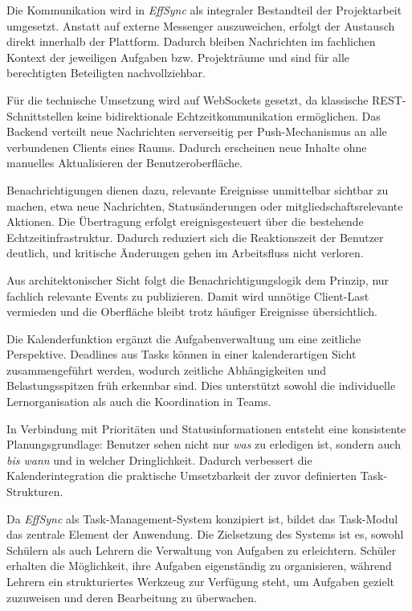 \label{sec:kommunikation}
Die Kommunikation wird in \textit{EffSync} als integraler Bestandteil der Projektarbeit umgesetzt. Anstatt auf externe Messenger auszuweichen, erfolgt der Austausch direkt innerhalb der Plattform. Dadurch bleiben Nachrichten im fachlichen Kontext der jeweiligen Aufgaben bzw. Projekträume und sind für alle berechtigten Beteiligten nachvollziehbar.

Für die technische Umsetzung wird auf WebSockets gesetzt, da klassische REST-Schnittstellen keine bidirektionale Echtzeitkommunikation ermöglichen. Das Backend verteilt neue Nachrichten serverseitig per Push-Mechanismus an alle verbundenen Clients eines Raums. Dadurch erscheinen neue Inhalte ohne manuelles Aktualisieren der Benutzeroberfläche.

\label{sec:benachrichtigungen}
Benachrichtigungen dienen dazu, relevante Ereignisse unmittelbar sichtbar zu machen, etwa neue Nachrichten, Statusänderungen oder mitgliedschaftsrelevante Aktionen. Die Übertragung erfolgt ereignisgesteuert über die bestehende Echtzeitinfrastruktur. Dadurch reduziert sich die Reaktionszeit der Benutzer deutlich, und kritische Änderungen gehen im Arbeitsfluss nicht verloren.

Aus architektonischer Sicht folgt die Benachrichtigungslogik dem Prinzip, nur fachlich relevante Events zu publizieren. Damit wird unnötige Client-Last vermieden und die Oberfläche bleibt trotz häufiger Ereignisse übersichtlich.

\label{sec:kalender}
Die Kalenderfunktion ergänzt die Aufgabenverwaltung um eine zeitliche Perspektive. Deadlines aus Tasks können in einer kalenderartigen Sicht zusammengeführt werden, wodurch zeitliche Abhängigkeiten und Belastungsspitzen früh erkennbar sind. Dies unterstützt sowohl die individuelle Lernorganisation als auch die Koordination in Teams.

In Verbindung mit Prioritäten und Statusinformationen entsteht eine konsistente Planungsgrundlage: Benutzer sehen nicht nur \textit{was} zu erledigen ist, sondern auch \textit{bis wann} und in welcher Dringlichkeit. Dadurch verbessert die Kalenderintegration die praktische Umsetzbarkeit der zuvor definierten Task-Strukturen.


\label{sec:taskverwaltung}
Da \textit{EffSync} als Task-Management-System konzipiert ist, bildet das Task-Modul das zentrale Element der Anwendung. Die Zielsetzung des Systems ist es, sowohl Schülern als auch Lehrern die Verwaltung von Aufgaben zu erleichtern. Schüler erhalten die Möglichkeit, ihre Aufgaben eigenständig zu organisieren, während Lehrern ein strukturiertes Werkzeug zur Verfügung steht, um Aufgaben gezielt zuzuweisen und deren Bearbeitung zu überwachen.

